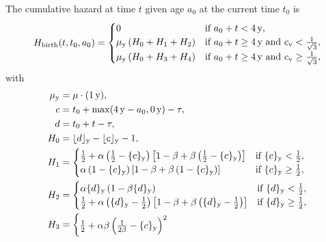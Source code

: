 \documentclass[12pt, UKenglish]{article}  %
\begin{document}
The cumulative hazard at time $t$ given age $a_0$ at the current
time $t_0$ is
\begin{equation}
  H_{\text{birth}}(t, t_0, a_0) =
  \begin{cases}
    0 & \text{if $a_0 + t < \unit[4]{y}$},
    \\
    \mu_{\mathrm{y}} \left(H_0 + H_1  + H_2\right)
    & \text{if $a_0 + t \geq \unit[4]{y}$
      and $c_{\text{v}} < \frac{1}{\sqrt{3}}$},
    \\
    \mu_{\mathrm{y}} \left(H_0 + H_3 + H_4\right)
    & \text{if $a_0 + t \geq \unit[4]{y}$
      and $c_{\text{v}} \geq \frac{1}{\sqrt{3}}$},
  \end{cases}
\end{equation}
with
\begin{equation}
  \begin{split}
    \mu_{\mathrm{y}} &= \mu \cdot (\unit[1]{y}),
    \\
    c &= t_0 + \max(\unit[4]{y} - a_0, \unit[0]{y}) - \tau,
    \\
    d &= t_0 + t - \tau,
    \\
    H_0 &= \lfloor d \rfloor_{\mathrm{y}} - \lfloor c \rfloor_{\mathrm{y}} - 1,
    \\
    H_1 &=
    \begin{cases}
      \frac{1}{2}
      + \alpha \left(\frac{1}{2} - \{c\}_{\mathrm{y}}\right)
      \left[1 - \beta
        + \beta \left(\frac{1}{2} - \{c\}_{\mathrm{y}}\right)\right]
      & \text{if $\{c\}_{\mathrm{y}} < \frac{1}{2}$},
      \\
      \alpha \left(1 - \{c\}_{\mathrm{y}}\right)
      \left[1 - \beta + \beta \left(1 - \{c\}_{\mathrm{y}}\right)\right]
      & \text{if $\{c\}_{\mathrm{y}} \geq \frac{1}{2}$},
    \end{cases}
    \\
    H_2 &=
    \begin{cases}
      \alpha \{d\}_{\mathrm{y}}\left(1 - \beta \{d\}_{\mathrm{y}}\right)
      & \text{if $\{d\}_{\mathrm{y}} < \frac{1}{2}$},
      \\
      \frac{1}{2}
      + \alpha \left(\{d\}_{\mathrm{y}} - \frac{1}{2}\right)
      \left[1 - \beta
        + \beta \left(\{d\}_{\mathrm{y}} - \frac{1}{2}\right)\right]
      & \text{if $\{d\}_{\mathrm{y}} \geq \frac{1}{2}$},
    \end{cases}
    \\
    H_3 &=
    \begin{cases}
      \frac{1}{2} + \alpha \beta \left(\frac{1}{2 \beta} - \{c\}_{\mathrm{y}}\right)^2

\end{cases}
\end{split}
\end{equation}
\end{document}
